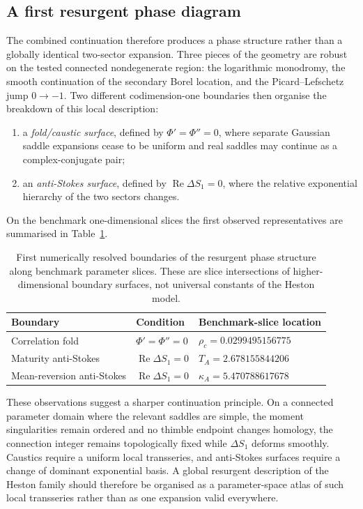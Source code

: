 \documentclass[11pt]{article}
\begin{document}
\subsection{A first resurgent phase diagram}
The combined continuation therefore produces a phase structure rather than a globally identical two-sector expansion.  Three pieces of the geometry are robust on the tested connected nondegenerate region: the logarithmic monodromy, the smooth continuation of the secondary Borel location, and the Picard--Lefschetz jump $0\to-1$.  Two different codimension-one boundaries then organise the breakdown of this local description:
\begin{enumerate}
 \item a \emph{fold/caustic surface}, defined by $\Phi'=\Phi''=0$, where separate Gaussian saddle expansions cease to be uniform and real saddles may continue as a complex-conjugate pair;
 \item an \emph{anti-Stokes surface}, defined by $\operatorname{Re}\Delta S_1=0$, where the relative exponential hierarchy of the two sectors changes.
\end{enumerate}
On the benchmark one-dimensional slices the first observed representatives are summarised in Table~\ref{tab:phaseboundaries}.

\begin{table}[H]
\centering
\begin{tabular}{lll}
\toprule
Boundary & Condition & Benchmark-slice location \\
\midrule
Correlation fold & $\Phi'=\Phi''=0$ & $\rho_c=0.0299495156775$ \\
Maturity anti-Stokes & $\operatorname{Re}\Delta S_1=0$ & $T_A=2.678155844206$ \\
Mean-reversion anti-Stokes & $\operatorname{Re}\Delta S_1=0$ & $\kappa_A=5.470788617678$ \\
\bottomrule
\end{tabular}
\caption{First numerically resolved boundaries of the resurgent phase structure along benchmark parameter slices. These are slice intersections of higher-dimensional boundary surfaces, not universal constants of the Heston model.}
\label{tab:phaseboundaries}
\end{table}

These observations suggest a sharper continuation principle.  On a connected parameter domain where the relevant saddles are simple, the moment singularities remain ordered and no thimble endpoint changes homology, the connection integer remains topologically fixed while $\Delta S_1$ deforms smoothly.  Caustics require a uniform local transseries, and anti-Stokes surfaces require a change of dominant exponential basis.  A global resurgent description of the Heston family should therefore be organised as a parameter-space atlas of such local transseries rather than as one expansion valid everywhere.
\end{document}
